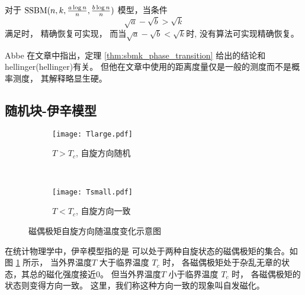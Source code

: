 \begin{theorem}\label{thm:sbmk_phase_transition}
  对于 $\operatorname{SSBM}(n,k,\frac{a \log n}{n}, \frac{b \log n}{n})$ 模型，当条件
  \begin{equation}\label{eq:abk}
    \sqrt{a} - \sqrt{b} > \sqrt{k}
  \end{equation}   
  满足时，
  精确恢复可实现，
  而当$\sqrt{a} - \sqrt{b} < \sqrt{k}$时,
  没有算法可实现精确恢复。
\end{theorem}
\begin{remark}
  Abbe 在文章中指出，定理 \ref{thm:sbmk_phase_transition}
  给出的结论和\gls{hellinger}(\glsdesc{hellinger})有关。
  但他在文章中使用的距离度量仅是一般的测度而不是概率测度，
  其解释略显生硬。
\end{remark}

\subsection{随机块-伊辛模型}\label{sec:ising}
\begin{figure}
	\centering
	\begin{subfigure}{0.5\textwidth}
    \centering
    \texttt{[image: Tlarge.pdf]}
		\caption{$T>T_c$, 自旋方向随机}
	\end{subfigure}~
	\begin{subfigure}{0.5\textwidth}
    \centering
    \texttt{[image: Tsmall.pdf]}
		\caption{$T<T_c$, 自旋方向一致}
	\end{subfigure}
  \caption{磁偶极矩自旋方向随温度变化示意图}\label{fig:ising_two_configurations}
\end{figure}   

在统计物理学中，伊辛模型指的是
可以处于两种自旋状态的磁偶极矩的集合\cite{ising1925beitrag}。如图
\ref{fig:ising_two_configurations} 所示，
当外界温度$T$
大于临界温度 $T_c$ 时，
各磁偶极矩处于杂乱无章的状态，其总的磁化强度接近0。
但当外界温度$T$
小于临界温度 $T_c$ 时，
各磁偶极矩的状态则变得方向一致。
这里，我们称这种方向一致的现象叫自发磁化。


